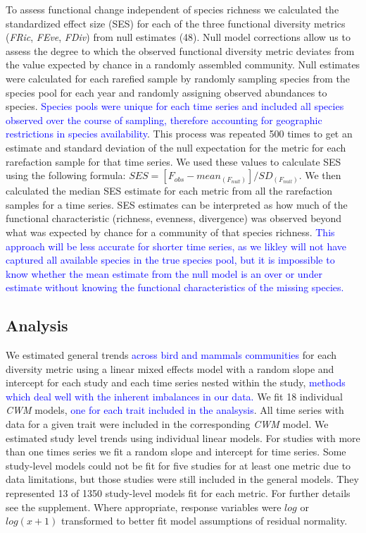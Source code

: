 \documentclass{article}
\begin{document}
To assess functional change independent of species richness we
calculated the standardized effect size (SES) for each of the three
functional diversity metrics (\emph{FRic}, \emph{FEve}, \emph{FDiv})
from null estimates (48). Null model corrections allow us to assess the
degree to which the observed functional diversity metric deviates from
the value expected by chance in a randomly assembled community. Null
estimates were calculated for each rarefied sample by randomly sampling
species from the species pool for each year and randomly assigning
observed abundances to species.
\textcolor{blue}{Species pools were unique for each time series and included all species observed over the course of sampling, therefore accounting for geographic restrictions in species availability}.
This process was repeated 500 times to get an estimate and standard
deviation of the null expectation for the metric for each rarefaction
sample for that time series. We used these values to calculate SES using
the following formula:
\(SES = [F_{obs} - mean_{(F_{null})}]/SD_{(F_{null})}\). We then
calculated the median SES estimate for each metric from all the
rarefaction samples for a time series. SES estimates can be interpreted
as how much of the functional characteristic (richness, evenness,
divergence) was observed beyond what was expected by chance for a
community of that species richness.
\textcolor{blue}{This approach will be less accurate for shorter time series, as we likley will not have captured all available species in the true species pool, but it is impossible to know whether the mean estimate from the null model is an over or under estimate without knowing the functional characteristics of the missing species.}

\hypertarget{analysis}{%
\subsection{Analysis}\label{analysis}}

We estimated general trends
\textcolor{blue}{across bird and mammals communities} for each diversity
metric using a linear mixed effects model with a random slope and
intercept for each study and each time series nested within the study,
\textcolor{blue}{methods which deal well with the inherent imbalances in our data.}
We fit 18 individual \emph{CWM} models,
\textcolor{blue}{one for each trait included in the analsysis}. All time
series with data for a given trait were included in the corresponding
\emph{CWM} model. We estimated study level trends using individual
linear models. For studies with more than one times series we fit a
random slope and intercept for time series. Some study-level models
could not be fit for five studies for at least one metric due to data
limitations, but those studies were still included in the general
models. They represented 13 of 1350 study-level models fit for each
metric. For further details see the supplement. Where appropriate,
response variables were \(log\) or \(log(x+1)\) transformed to better
fit model assumptions of residual normality.
\end{document}
